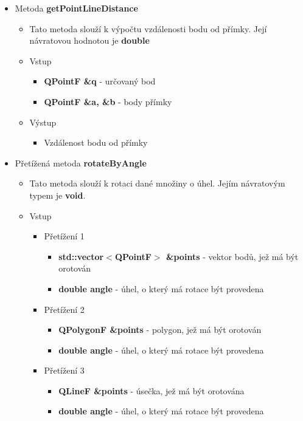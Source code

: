 \documentclass[a4paper, 12pt]{article}
\begin{document}
\begin{itemize}
	\item Metoda \textbf{getPointLineDistance}
		\begin{itemize}
			\item Tato metoda slouží k výpočtu vzdálenosti bodu od přímky. Její návratovou hodnotou je \textbf {double} %
			\item Vstup
				\begin{itemize}
					\item \textbf{QPointF \&q} - určovaný bod
					\item \textbf{QPointF \&a, \&b} - body přímky
				\end{itemize}
			\item Výstup
				\begin{itemize}
					\item Vzdálenost bodu od přímky
				\end{itemize}
		\end{itemize}

	\item Přetížená metoda \textbf{rotateByAngle}
		\begin{itemize}
			\item Tato metoda slouží k rotaci dané množiny o úhel. Jejím návratovým typem je \textbf{void}.
			\item Vstup
				\begin{itemize}
					\item Přetížení 1
						\begin{itemize}
							\item \textbf{std::vector$<$QPointF$>$ \&points} - vektor bodů, jež má být orotován
							\item \textbf{double angle} - úhel, o který má rotace být provedena
 						\end{itemize}
					
					\item Přetížení 2
						\begin{itemize}
							\item \textbf{QPolygonF \&points} - polygon, jež má být orotován
							\item \textbf{double angle} - úhel, o který má rotace být provedena
 						\end{itemize}

					\item Přetížení 3
						\begin{itemize}
							\item \textbf{QLineF \&points} - úsečka, jež má být orotována
							\item \textbf{double angle} - úhel, o který má rotace být provedena
 						\end{itemize}					
				\end{itemize}
			

\end{itemize}
\end{itemize}
\end{document}
